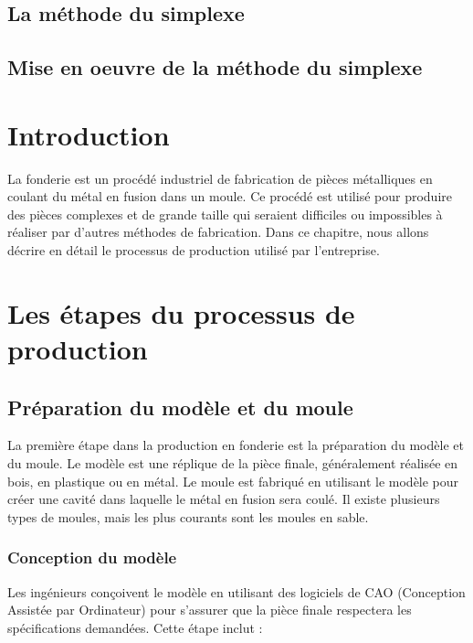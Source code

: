 \documentclass[12pt]{article}
\begin{document}
\subsection{La méthode du simplexe}

\subsection{Mise en oeuvre de la méthode du simplexe}











\section{Introduction}
La fonderie est un procédé industriel de fabrication de pièces métalliques en coulant du métal en fusion dans un moule. Ce procédé est utilisé pour produire des pièces complexes et de grande taille qui seraient difficiles ou impossibles à réaliser par d'autres méthodes de fabrication. Dans ce chapitre, nous allons décrire en détail le processus de production utilisé par l'entreprise.

\section{Les étapes du processus de production}

\subsection{Préparation du modèle et du moule}
La première étape dans la production en fonderie est la préparation du modèle et du moule. Le modèle est une réplique de la pièce finale, généralement réalisée en bois, en plastique ou en métal. Le moule est fabriqué en utilisant le modèle pour créer une cavité dans laquelle le métal en fusion sera coulé. Il existe plusieurs types de moules, mais les plus courants sont les moules en sable.

\subsubsection{Conception du modèle}
Les ingénieurs conçoivent le modèle en utilisant des logiciels de CAO (Conception Assistée par Ordinateur) pour s'assurer que la pièce finale respectera les spécifications demandées. Cette étape inclut :
\end{document}

